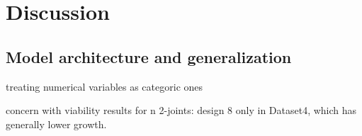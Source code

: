 \section{Discussion}


\subsection{Model architecture and generalization}

treating numerical variables as categoric ones 

concern with viability results for n 2-joints: design 8 only in Dataset4, which
has generally lower growth. 